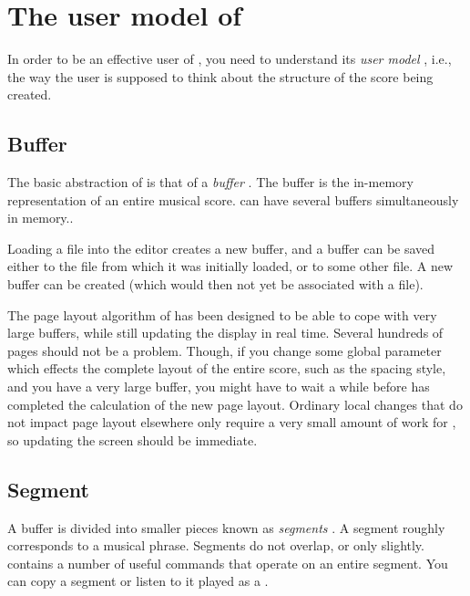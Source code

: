 \chapter{The user model of \sysname{}}
\label{user-model}

In order to be an effective user of \sysname{}, you need to understand its
\emph{user model} , i.e., the way the user is
supposed to think about the structure of the score being created.

\section{Buffer}
\label{model-buffer}

The basic abstraction of \sysname{} is that of a \emph{buffer}
.  The buffer is the in-memory representation of an
entire musical score.  \sysname{} can have several buffers simultaneously
in memory..  

Loading a \sysname{} file into the editor creates a new buffer, and a
buffer can be saved either to the file from which it was initially
loaded, or to some other file.  A new buffer can be created (which
would then not yet be associated with a file).  

The page layout algorithm of \sysname{} has been designed to be able to
cope with very large buffers, while still updating the display in real
time.  Several hundreds of pages should not be a problem.  Though, if
you change some global parameter which effects the complete layout of
the entire score, such as the spacing style, and you have a very large
buffer, you might have to wait a while before \sysname{} has completed the
calculation of the new page layout.  Ordinary local changes that do
not impact page layout elsewhere only require a very small amount of
work for \sysname{}, so updating the screen should be immediate. 

\section{Segment}
\label{model-segment}

A buffer is divided into smaller pieces known as \emph{segments}
.  A segment roughly corresponds to a musical phrase.
Segments do not overlap, or only slightly.  \sysname{} contains a number of
useful commands that operate on an entire segment.  You can copy a
segment or listen to it played as a {\midifile}.

